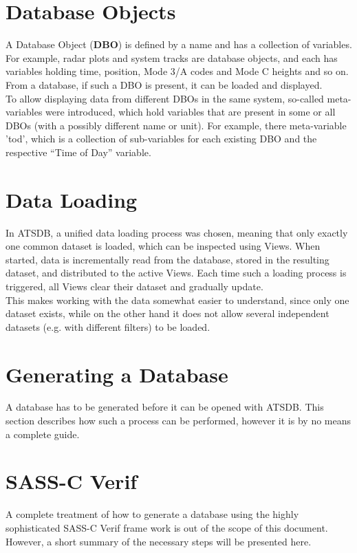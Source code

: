 \section*{Database Objects}
A Database Object (\textbf{DBO}) is defined by a name and has a collection of variables. For example, radar plots and system tracks are database objects, and each has variables holding time, position, Mode 3/A codes and Mode C heights and so on. From a database, if such a DBO is present, it can be loaded and displayed.\\

To allow displaying data from different DBOs in the same system, so-called meta-variables were  introduced, which hold variables that are present in some or all DBOs (with a possibly different name or unit).  For example, there meta-variable 'tod', which is a collection of sub-variables for each existing DBO and the respective ``Time of Day'' variable.

\section*{Data Loading}
In ATSDB, a unified data loading process was chosen, meaning that only exactly one common dataset is loaded, which can be inspected using Views. When started, data is incrementally read from the database, stored in the resulting dataset, and distributed to the active Views. Each time such a loading process is triggered, all Views clear their dataset and gradually update. \\
This makes working with the data somewhat easier to understand, since only one dataset exists, while on the other hand it does not allow several independent datasets (e.g. with different filters) to be loaded.

\section*{Generating a Database}
\label{sec:generation}

A database has to be generated before it can be opened with ATSDB.  This section describes how such
a process can be performed, however it is by no means a complete guide.

\section*{SASS-C Verif}
A complete treatment of how to generate a database using the highly sophisticated SASS-C Verif frame work  is  out  of  the  scope  of  this  document.   However,  a  short  summary  of  the  necessary  steps  will  be presented here.\\

